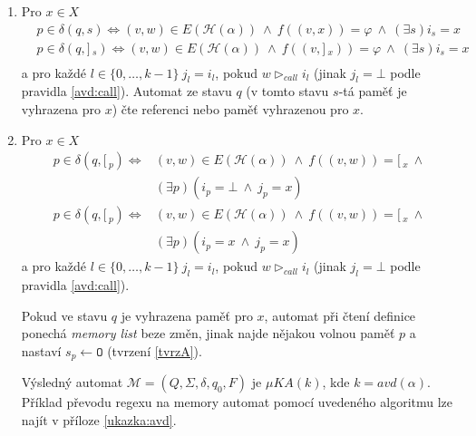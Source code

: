 \documentclass[thesis=B,czech]{FITthesis}[2019/12/23]
\theoremstyle{definition}
\begin{document}
\begin{enumerate}
{	S $x$-přechodem ze stavu $q$ lze zacházet jako s $\varepsilon$-přechodem, pokud v $q$ není vyhrazena žádná paměť pro $x$.}
	\item{Pro $x \in X$
	 \begin{equation}\begin{split}&p \in \delta(q, s) \iff (v, w) \in E(\mathcal{H}(\alpha)) \ \wedge \ f((v, x))=\varphi \ \wedge \  (\exists s) i_s = x \\
						   &p \in \delta(q, ]\,_s) \iff (v, w) \in E(\mathcal{H}(\alpha)) \ \wedge \ f((v, ]\,_x))=\varphi \ \wedge \  (\exists s) i_s = x \\
	\end{split}\end{equation}  a 
			pro každé $l \in \{0, \dots, k-1\} \  j_l = i_l$, pokud $w \triangleright_{call} i_l$ (jinak $j_l = \bot$ podle pravidla \ref{avd:call}).
Automat ze stavu $q$ (v tomto stavu $s$-tá paměť je vyhrazena pro $x$) čte referenci nebo  paměť vyhrazenou pro $x$. }
	\item\label{rule7}{Pro $x \in X$
		\begin{equation}\label{tvrzA}\begin{split} p \in \delta(q, [\,_p) \iff &(v, w) \in E(\mathcal{H}(\alpha)) \ \wedge \ f((v, w))= [\,_x \ \wedge \\  &(\exists p) (i_p = \bot \ \wedge \ j_p=x)\end{split}\end{equation}
		\begin{equation}\begin{split}
		 p \in \delta(q, [\,_p) \iff &(v, w) \in E(\mathcal{H}(\alpha)) \ \wedge \ f((v, w))= [\,_x \ \wedge \\ &(\exists p) (i_p = x \ \wedge \ j_p=x) 
		\end{split}\end{equation} a 
			pro každé $l \in \{0, \dots, k-1\} \  j_l = i_l$, pokud $w \triangleright_{call} i_l$ (jinak $j_l = \bot$ podle pravidla \ref{avd:call}).

		Pokud ve stavu $q$ je vyhrazena paměť pro $x$, automat při čtení definice ponechá \emph{memory list} beze změn, jinak najde nějakou volnou paměť $p$ a nastaví $s_p \gets \texttt{O}$ (tvrzení \ref{tvrzA}).
	
	}
	
	Výsledný automat $\mathcal{M} = (Q, \Sigma, \delta, q_0, F)$ je $\mu KA(k)$, kde $k = avd(\alpha)$.
	Příklad převodu regexu na memory automat pomocí uvedeného algoritmu lze najít v příloze \ref{ukazka:avd}.


\end{enumerate}
\end{document}
